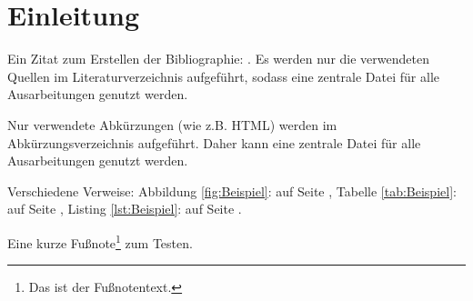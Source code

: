 \section{Einleitung}
\label{sec:Einleitung}

Ein Zitat zum Erstellen der Bibliographie: .
Es werden nur die verwendeten Quellen im Literaturverzeichnis aufgeführt, sodass
eine zentrale Datei für alle Ausarbeitungen genutzt werden.

Nur verwendete Abkürzungen (wie z.B. \ac{HTML}) werden im Abkürzungsverzeichnis aufgeführt.
Daher kann eine zentrale Datei für alle Ausarbeitungen genutzt werden.

Verschiedene Verweise: Abbildung \ref{fig:Beispiel}:  auf Seite \pageref{fig:Beispiel}, Tabelle \ref{tab:Beispiel}:  auf Seite \pageref{tab:Beispiel}, Listing \ref{lst:Beispiel}:  auf Seite \pageref{lst:Beispiel}.

Eine kurze Fußnote\footnote{Das ist der Fußnotentext.} zum Testen.